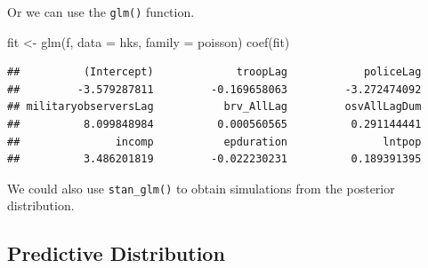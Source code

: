 \documentclass[
]{book}
\newenvironment{Shaded}{\begin{snugshade}}{\end{snugshade}}
\newcommand{\AttributeTok}[1]{\textcolor[rgb]{0.77,0.63,0.00}{#1}}
\newcommand{\ControlFlowTok}[1]{\textcolor[rgb]{0.13,0.29,0.53}{\textbf{#1}}}
\newcommand{\DecValTok}[1]{\textcolor[rgb]{0.00,0.00,0.81}{#1}}
\newcommand{\FunctionTok}[1]{\textcolor[rgb]{0.00,0.00,0.00}{#1}}
\newcommand{\NormalTok}[1]{#1}
\newcommand{\OtherTok}[1]{\textcolor[rgb]{0.56,0.35,0.01}{#1}}
\newcommand{\SpecialCharTok}[1]{\textcolor[rgb]{0.00,0.00,0.00}{#1}}
\newcommand{\StringTok}[1]{\textcolor[rgb]{0.31,0.60,0.02}{#1}}
\begin{document}
Or we can use the \texttt{glm()} function.

\begin{Shaded}
\begin{Highlighting}[]
\NormalTok{fit }\OtherTok{\textless{}{-}} \FunctionTok{glm}\NormalTok{(f, }\AttributeTok{data =}\NormalTok{ hks, }\AttributeTok{family =}\NormalTok{ poisson)}
\FunctionTok{coef}\NormalTok{(fit)}
\end{Highlighting}
\end{Shaded}

\begin{verbatim}
##          (Intercept)             troopLag            policeLag 
##         -3.579287811         -0.169658063         -3.272474092 
## militaryobserversLag           brv_AllLag         osvAllLagDum 
##          8.099848984          0.000560565          0.291144441 
##               incomp           epduration               lntpop 
##          3.486201819         -0.022230231          0.189391395
\end{verbatim}

We could also use \texttt{stan\_glm()} to obtain simulations from the posterior distribution.

\hypertarget{predictive-distribution-1}{%
\subsection{Predictive Distribution}\label{predictive-distribution-1}}

\begin{Shaded}
\end{Shaded}
\end{document}
